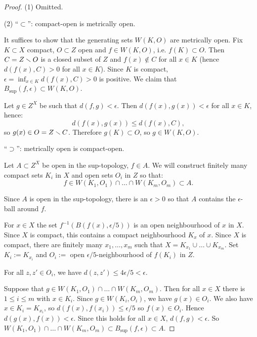 \begin{proof}
(1) Omitted.

(2) \enquote{$\subset$}: compact-open is metrically open.

It suffices to show that the generating sets $W(K,O)$ are metrically open. Fix $K\subset X$ compact, $O\subset Z$ open and $f\in W(K,O)$, i.e. $f(K)\subset O$. Then $C=Z\smallsetminus O$ is a closed subset of $Z$ and $f(x)\not\in C$ for all $x\in K$ (hence $d(f(x),C)>0$ for all $x\in K$). Since $K$ is compact, $\epsilon=\inf_{x\in K}d(f(x),C)>0$
is positive.
We claim that $B_{\sup}(f,\epsilon)\subset W(K,O)$.

Let $g\in Z^X$ be such that $d(f,g)<\epsilon$. Then $d(f(x),g(x))<\epsilon$ for all $x\in K$, hence:
\[d(f(x),g(x))\leq d(f(x),C),\]
so $g(x)\in O=Z\smallsetminus C$. Therefore $g(K)\subset O$, so $g\in W(K,O)$.

\enquote{$\supset$}: metrically open is compact-open.

Let $A\subset Z^X$ be open in the sup-topology, $f\in A$. We will construct finitely many compact sets $K_i$ in $X$ and open sets $O_i$ in $Z$ so that:
\[f\in W(K_1,O_1)\cap\dots\cap W(K_m,O_m)\subset A.\]

Since $A$ is open in the sup-topology, there is an $\epsilon>0$ so that $A$ contains the $\epsilon$-ball around $f$.

For $x\in X$ the set $f^{-1}(B(f(x),\epsilon/5))$ is an open neighbourhood of $x$ in $X$. Since $X$ is compact, this contains a compact neighbourhood $K_x$ of $x$. Since $X$ is compact, there are finitely many $x_1,\dots,x_m$ such that $X=K_{x_1}\cup\dots\cup K_{x_m}$.
Set $K_i:=K_{x_i}$ and $O_i:=$ open $\epsilon/5$-neighbourhood of $f(K_i)$ in $Z$.

For all $z,z'\in O_i$, we have $d(z,z')\leq 4\epsilon/5<\epsilon$.\alvaropls

Suppose that $g\in W(K_1,O_1)\cap\dots\cap W(K_m,O_m)$. Then for all $x\in X$ there is $1\leq i\leq m$ with $x\in K_i$. Since $g\in W(K_i,O_i)$, we have $g(x)\in O_i$. We also have $x\in K_i=K_{x_i}$, so $d(f(x),f(x_i))\leq\epsilon/5$ so $f(x)\in O_i$. Hence $d(g(x),f(x))<\epsilon$. Since this holds for all $x\in X$, $d(f,g)<\epsilon$. So $W(K_1,O_1)\cap\dots\cap W(K_m,O_m)\subset B_{\sup}(f,\epsilon)\subset A$.
\end{proof}
